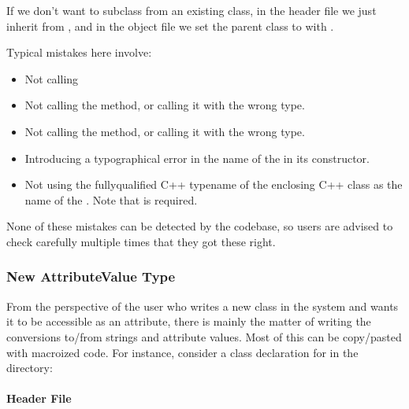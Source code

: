 \documentclass[letterpaper,10pt,english]{sphinxmanual}
\renewcommand{\sphinxcode}[1]{\texttt{\small{#1}}}
\begin{document}
If we don’t want to subclass from an existing class, in the header file
we just inherit from \sphinxcode{}, and in the object file
we set the parent class to \sphinxcode{} with
\sphinxcode{\sphinxupquote{.SetParent\textless{}Object\textgreater{} ()}}.

Typical mistakes here involve:
\begin{itemize}
\item {} 
Not calling \sphinxcode{}

\item {} 
Not calling the \sphinxcode{} method,
or calling it with the wrong type.

\item {} 
Not calling the \sphinxcode{} method,
or calling it with the wrong type.

\item {} 
Introducing a typographical error in the name of the \sphinxcode{}
in its constructor.

\item {} 
Not using the fully\sphinxhyphen{}qualified C++ typename of the enclosing C++ class as the
name of the \sphinxcode{}.  Note that \sphinxcode{} is required.

\end{itemize}

None of these mistakes can be detected by the  codebase, so users
are advised to check carefully multiple times that they got these right.


\subsubsection{New AttributeValue Type}
\label{\detokenize{attributes:new-attributevalue-type}}
From the perspective of the user who writes a new class in the system and wants
it to be accessible as an attribute, there is mainly the matter of writing the
conversions to/from strings and attribute values.  Most of this can be
copy/pasted with macro\sphinxhyphen{}ized code.  For instance, consider a class declaration
for \sphinxcode{} in the \sphinxcode{} directory:


\paragraph{Header File}
\label{\detokenize{attributes:header-file}}
\begin{sphinxVerbatim}[commandchars=\\\{\}]
 

   
   
   
   
\end{sphinxVerbatim}
\end{document}
